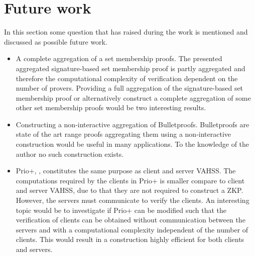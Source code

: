 \section*{Future work}
In this section some question that has raised during the work is mentioned and discussed as possible future work.
\begin{itemize}
\item A complete aggregation of a set membership proofs. The presented aggregated signature-based set membership proof is partly aggregated and therefore the computational complexity of verification dependent on the number of provers.  Providing a full aggregation of the signature-based set membership proof or alternatively construct a complete aggregation of some other set membership proofs would be two interesting results.

\item Constructing a non-interactive aggregation of Bulletproofs. Bulletproofs are state of the art range proofs aggregating them using a non-interactive construction would be useful in many applications. To the knowledge of the author no such construction exists. 

\item Prio+, \cite{prioPlus}, constitutes the same purpose as client and server VAHSS. The computations required by the clients in Prio+ is smaller compare to client and server VAHSS, due to that they are not required to construct a ZKP. However, the servers must communicate to verify the clients.  An interesting topic would be to investigate if Prio+ can be modified such that the verification of clients can be obtained without communication between the servers and with a computational complexity independent of the number of clients. This would result in a construction highly efficient for both clients and servers. 
\end{itemize}






